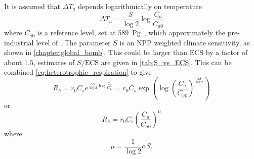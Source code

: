 It is assumed that $\Delta T_a$ depends logarithmically on temperature
\begin{equation}
  \label{eq:air_temperature}
  \Delta T_a = \frac{S}{\log 2} \log \frac{C_a}{C_{a0}}
\end{equation}
where $C_{a0}$ is a reference  level, set at \SI{589}{\peta\gram\carbon}, which approximately the pre-industrial
level of . The parameter $S$ is an NPP weighted climate sensitivity, as shown in
\cref{chapter:global_bomb}. This could be larger than $\mathrm{ECS}$ by a factor of about $1.5$, estimates of $S/\mathrm{ECS}$ are given
in \cref{tab:S_vs_ECS}. This can be combined \cref{eq:heterotrophic_respiration} to give
\begin{equation}
  R_h = r_0 C_s e^{\frac{\alpha S}{\log 2} \log \frac{C_a}{C_{a0}}} = r_0 C_s \exp\left(\log \left(\frac{C_a}{C_{a0}}\right)^{\frac{\alpha S}{\log 2}}\right)
\end{equation}
or
\begin{equation}
  \label{eq:heterotrophic_respiration_combined}
  R_h = r_0 C_s \left( \frac{C_a}{C_{a0}}\right)^{\mu}
\end{equation}
where
\begin{equation}
  \label{eq:mu}
  \mu = \frac{1}{\log 2} \alpha S.
\end{equation}



